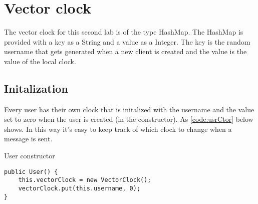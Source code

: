 \section{Vector clock}
The vector clock for this second lab is of the type HashMap. The HashMap is provided with a key as a String and a value as a Integer.
The key is the random username that gets generated when a new client is created and the value is the value of the local clock.

\subsection{Initalization}
Every user has their own clock that is initalized with the username and the value set to zero when the user is created (in the constructor). As  \cref{code:usrCtor} below shows.
In this way it's easy to keep track of which clock to change when a message is sent.

\begin{listing}
\caption{User constructor}
\label{code:usrCtor}
\begin{verbatim}
public User() {
    this.vectorClock = new VectorClock();
    vectorClock.put(this.username, 0);
}
\end{verbatim}
\end{listing}